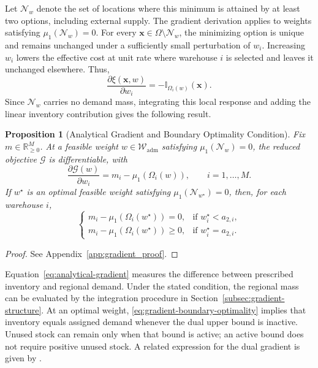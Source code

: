 \documentclass[a4paper,fleqn]{cas-sc}
\newtheorem{proposition}[theorem]{Proposition}
\theoremstyle{remark}
\theoremstyle{plain}
\begin{document}
Let $\mathcal N_w$ denote the set of locations where this minimum is attained by at least two options, including external supply. The gradient derivation applies to weights satisfying $\mu_1(\mathcal N_w)=0$. For every $\bm x\in\Omega\setminus\mathcal N_w$, the minimizing option is unique and remains unchanged under a sufficiently small perturbation of $w_i$. Increasing $w_i$ lowers the effective cost at unit rate where warehouse $i$ is selected and leaves it unchanged elsewhere. Thus,
\[
    \frac{\partial\xi(\bm x,w)}{\partial w_i}=-\mathbb I_{\Omega_i(w)}(\bm x).
\]
Since $\mathcal N_w$ carries no demand mass, integrating this local response and adding the linear inventory contribution gives the following result.

\begin{proposition}[Analytical Gradient and Boundary Optimality Condition]
\label{prop:analytical_gradient}
Fix $m\in\mathbb R_{\ge0}^M$. At a feasible weight $w\in\mathcal W_{\mathrm{adm}}$ satisfying $\mu_1(\mathcal N_w)=0$, the reduced objective $\mathcal G$ is differentiable, with
\begin{equation}\label{eq:analytical-gradient}
    \frac{\partial\mathcal G(w)}{\partial w_i}=m_i-\mu_1(\Omega_i(w)),\qquad i=1,\ldots,M.
\end{equation}
If $w^\star$ is an optimal feasible weight satisfying $\mu_1(\mathcal N_{w^\star})=0$, then, for each warehouse $i$,
\begin{equation}\label{eq:gradient-boundary-optimality}
    \begin{cases}
        m_i-\mu_1(\Omega_i(w^\star))=0, & \text{if }w_i^\star<a_{2,i},\\[4pt]
        m_i-\mu_1(\Omega_i(w^\star))\ge0, & \text{if }w_i^\star=a_{2,i}.
    \end{cases}
\end{equation}
\end{proposition}
\begin{proof}
See Appendix~\ref{app:gradient_proof}.
\end{proof}

Equation~\eqref{eq:analytical-gradient} measures the difference between prescribed inventory and regional demand. Under the stated condition, the regional mass can be evaluated by the integration procedure in Section~\ref{subsec:gradient-structure}. At an optimal weight, \eqref{eq:gradient-boundary-optimality} implies that inventory equals assigned demand whenever the dual upper bound is inactive. Unused stock can remain only when that bound is active; an active bound does not require positive unused stock. A related expression for the dual gradient is given by \citet[Proposition~3.1]{chungunbalanced}.
\end{document}
